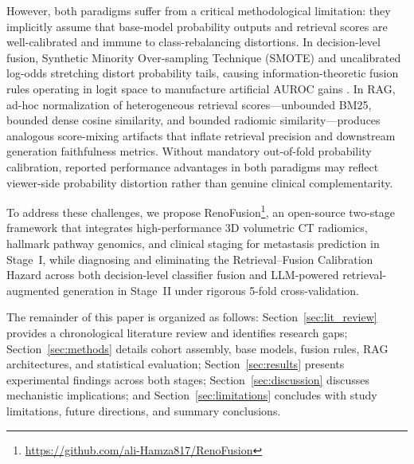 However, both paradigms suffer from a critical methodological limitation: they implicitly assume that base-model probability outputs and retrieval scores are well-calibrated and immune to class-rebalancing distortions. In decision-level fusion, Synthetic Minority Over-sampling Technique (SMOTE) and uncalibrated log-odds stretching distort probability tails, causing information-theoretic fusion rules operating in logit space to manufacture artificial AUROC gains \cite{chen2016calibrating, andersen2024impact, maierhein2024metrics}. In RAG, ad-hoc normalization of heterogeneous retrieval scores---unbounded BM25, bounded dense cosine similarity, and bounded radiomic similarity---produces analogous score-mixing artifacts that inflate retrieval precision and downstream generation faithfulness metrics. Without mandatory out-of-fold probability calibration, reported performance advantages in both paradigms may reflect viewer-side probability distortion rather than genuine clinical complementarity.

To address these challenges, we propose RenoFusion\footnote{\url{https://github.com/ali-Hamza817/RenoFusion}}, an open-source two-stage framework that integrates high-performance 3D volumetric CT radiomics, hallmark pathway genomics, and clinical staging for metastasis prediction in Stage~I, while diagnosing and eliminating the Retrieval--Fusion Calibration Hazard across both decision-level classifier fusion and LLM-powered retrieval-augmented generation in Stage~II under rigorous 5-fold cross-validation.

The remainder of this paper is organized as follows: Section~\ref{sec:lit_review} provides a chronological literature review and identifies research gaps; Section~\ref{sec:methods} details cohort assembly, base models, fusion rules, RAG architectures, and statistical evaluation; Section~\ref{sec:results} presents experimental findings across both stages; Section~\ref{sec:discussion} discusses mechanistic implications; and Section~\ref{sec:limitations} concludes with study limitations, future directions, and summary conclusions.
